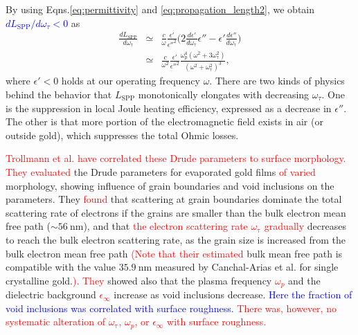\documentclass[aip,apl,reprint]{revtex4-1}
\begin{document}
\color{red}
By using Eqns.\ref{eq:permittivity} and \ref{eq:propagation_length2}, we obtain \textcolor{blue}{$dL_{\mathrm{SPP}}/d\omega_{\tau} < 0$} as
\begin{eqnarray}
\frac{dL_{\mathrm{SPP}}}{d\omega_{\mathrm{\tau}}} &\simeq& \frac{c}{\omega} \frac{\epsilon'}{\epsilon''^2} \biggl( 2\frac{d\epsilon'}{d\omega_{\mathrm{\tau}}}\epsilon'' - \epsilon' \frac{d\epsilon''}{d\omega_{\mathrm{\tau}}} \biggr) \nonumber \\
&\simeq& \frac{c}{\omega^2} \frac{\epsilon'}{\epsilon''^2} \frac{\omega_p^4 (\omega^2+3\omega_{\mathrm{\tau}}^2)}{ (\omega^2+\omega_{\mathrm{\tau}}^2)^3},
\end{eqnarray}
where $\epsilon'<0$ holds at our operating frequency $\omega$. %
There are two kinds of physics behind the behavior that $L_{\mathrm{SPP}}$ monotonically elongates with decreasing $\omega_{\tau}$. One is the suppression in local Joule heating efficiency, expressed as a decrease in $\epsilon''$. The other is that more portion of the electromagnetic field exists in air (or outside gold), which suppresses the total Ohmic losses.


\color{black}
\textcolor{red}{Trollmann et al.\cite{Trollmann} have correlated these Drude parameters to surface morphology. They evaluated} the Drude parameters for evaporated gold films \textcolor{red}{of varied} morphology, showing influence of grain boundaries and void inclusions on the parameters. They \textcolor{red}{found} that scattering at grain boundaries dominate the total scattering rate of electrons if the grains are smaller than the bulk electron mean free path ($\sim 56\:\mathrm{nm}$), and that \textcolor{red}{the electron scattering rate $\omega_{\mathrm{\tau}}$ gradually} decreases to reach the bulk electron scattering rate, as the grain size is increased from the bulk electron mean free path \textcolor{red}{(Note that their estimated} bulk mean free path is compatible with the value $35.9 \:\mathrm{nm}$ measured by Canchal-Arias et al.\cite{Canchal-Arias} for single crystalline gold.\textcolor{red}{).} 
\textcolor{red}{They} showed also that the plasma frequency \textcolor{red}{$\omega_p$} and the dielectric background \textcolor{red}{$\epsilon_{\infty}$} increase as void inclusions decrease. \textcolor{blue}{Here the fraction of void inclusions was correlated with surface roughness.} \textcolor{red}{There was, however, no systematic alteration of $\omega_{\mathrm{\tau}}$, $\omega_p$, or $\epsilon_{\infty}$ with surface roughness.}
\end{document}
